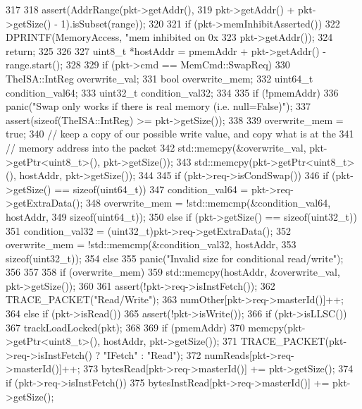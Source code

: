 \begin{DoxyCode}
317 {
318     assert(AddrRange(pkt->getAddr(),
319                      pkt->getAddr() + pkt->getSize() - 1).isSubset(range));
320 
321     if (pkt->memInhibitAsserted()) {
322         DPRINTF(MemoryAccess, "mem inhibited on 0x%
323                 pkt->getAddr());
324         return;
325     }
326 
327     uint8_t *hostAddr = pmemAddr + pkt->getAddr() - range.start();
328 
329     if (pkt->cmd == MemCmd::SwapReq) {
330         TheISA::IntReg overwrite_val;
331         bool overwrite_mem;
332         uint64_t condition_val64;
333         uint32_t condition_val32;
334 
335         if (!pmemAddr)
336             panic("Swap only works if there is real memory (i.e. null=False)");
337         assert(sizeof(TheISA::IntReg) >= pkt->getSize());
338 
339         overwrite_mem = true;
340         // keep a copy of our possible write value, and copy what is at the
341         // memory address into the packet
342         std::memcpy(&overwrite_val, pkt->getPtr<uint8_t>(), pkt->getSize());
343         std::memcpy(pkt->getPtr<uint8_t>(), hostAddr, pkt->getSize());
344 
345         if (pkt->req->isCondSwap()) {
346             if (pkt->getSize() == sizeof(uint64_t)) {
347                 condition_val64 = pkt->req->getExtraData();
348                 overwrite_mem = !std::memcmp(&condition_val64, hostAddr,
349                                              sizeof(uint64_t));
350             } else if (pkt->getSize() == sizeof(uint32_t)) {
351                 condition_val32 = (uint32_t)pkt->req->getExtraData();
352                 overwrite_mem = !std::memcmp(&condition_val32, hostAddr,
353                                              sizeof(uint32_t));
354             } else
355                 panic("Invalid size for conditional read/write\n");
356         }
357 
358         if (overwrite_mem)
359             std::memcpy(hostAddr, &overwrite_val, pkt->getSize());
360 
361         assert(!pkt->req->isInstFetch());
362         TRACE_PACKET("Read/Write");
363         numOther[pkt->req->masterId()]++;
364     } else if (pkt->isRead()) {
365         assert(!pkt->isWrite());
366         if (pkt->isLLSC()) {
367             trackLoadLocked(pkt);
368         }
369         if (pmemAddr)
370             memcpy(pkt->getPtr<uint8_t>(), hostAddr, pkt->getSize());
371         TRACE_PACKET(pkt->req->isInstFetch() ? "IFetch" : "Read");
372         numReads[pkt->req->masterId()]++;
373         bytesRead[pkt->req->masterId()] += pkt->getSize();
374         if (pkt->req->isInstFetch())
375             bytesInstRead[pkt->req->masterId()] += pkt->getSize();
}}
\end{DoxyCode}
